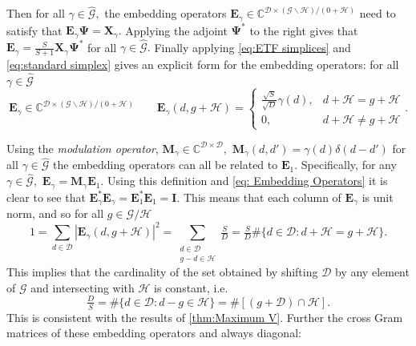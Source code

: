 \documentclass[3p,11pt]{elsarticle}
\newcommand{\bbC}{\mathbb{C}}
\newcommand{\bfE}{\mathbf{E}}
\newcommand{\bfI}{\mathbf{I}}
\newcommand{\bfM}{\mathbf{M}}
\newcommand{\bfX}{\mathbf{X}}
\newcommand{\bfPsi}{\boldsymbol{\Psi}}
\newcommand{\calD}{\mathcal{D}}
\newcommand{\calG}{\mathcal{G}}
\newcommand{\calH}{\mathcal{H}}
\newcommand{\abs}[1]{|{#1}|}
\theoremstyle{definition}
\begin{document}
Then for all $\gamma\in\hat{\calG},$ the embedding operators $\bfE_\gamma\in\bbC^{\calD\times(\calG\backslash\calH)/(0+\calH)}$ need to satisfy that $\bfE_\gamma\bfPsi=\bfX_\gamma.$ Applying the adjoint $\bfPsi^*$ to the right gives that $\bfE_\gamma=\tfrac{S}{S+1}\bfX_\gamma\bfPsi^*$ for all $\gamma\in\hat{\calG}.$ Finally applying \eqref{eq:ETF simplices} and \eqref{eq:standard simplex} gives an explicit form for the embedding operators: for all $\gamma\in\hat{\calG}$
\begin{equation}
\label{eq: Embedding Operators}
    \bfE_\gamma\in\bbC^{\calD\times(\calG\backslash\calH)/(0+\calH)}\qquad \bfE_\gamma(d,g+\calH)=\left\{\begin{array}{cl}
\tfrac{\sqrt{S}}{\sqrt{D}}\gamma(d), &d+\calH=g+\calH\\
0, & d+\calH\not=g+\calH
\end{array}.\right.
\end{equation}

Using the \textit{modulation operator}, $\bfM_\gamma\in\bbC^{\calD\times\calD},$ $\bfM_\gamma(d,d')=\gamma(d)\delta(d-d')$ for all $\gamma\in\hat{\calG}$ the embedding operators can all be related to $\bfE_1.$ Specifically, for any $\gamma\in\hat{\calG},$ $\bfE_\gamma=\bfM_\gamma\bfE_1.$ Using this definition and \eqref{eq: Embedding Operators} it is clear to see that $\bfE_\gamma^*\bfE_\gamma^{}=\bfE_1^*\bfE_1^{}=\bfI.$ This means that each column of $\bfE_\gamma$ is unit norm, and so for all $g\in\calG/\calH$
\begin{equation*}
    1=\sum_{d\in\calD}\abs{\bfE_\gamma(d,g+\calH)}^2=\sum_{\substack{d\in\calD\\g-d\in\calH}}\tfrac{S}{D}=\tfrac{S}{D}\#\{d\in\calD:d+\calH=g+\calH\}.
\end{equation*}
This implies that the cardinality of the set obtained by shifting $\calD$ by any element of $\calG$ and intersecting with $\calH$ is constant, i.e.
\begin{equation}
    \label{eq: Constant size of (g+D) intersect H}
    \tfrac{D}{S}=\#\{d\in\calD:d-g\in\calH\}=\#\left[(g+\calD)\cap\calH\right].
\end{equation}
This is consistent with the results of \ref{thm:Maximum V}. Further the cross Gram matrices of these embedding operators and always diagonal:
\end{document}
